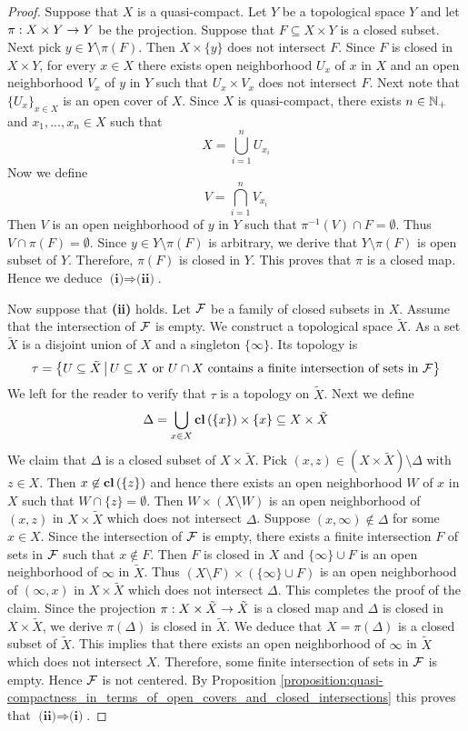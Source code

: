 \begin{proof}
	Suppose that $X$ is a quasi-compact. Let $Y$ be a topological space $Y$ and let $\pi:X\times Y \rightarrow Y$ be the projection. Suppose that $F \subseteq X \times Y$ is a closed subset. Next pick $y \in Y\setminus \pi(F)$. Then $X\times \{y\}$ does not intersect $F$. Since $F$ is closed in $X\times Y$, for every $x \in X$ there exists open neighborhood $U_x$ of $x$ in $X$ and an open neighborhood $V_x$ of $y$ in $Y$ such that $U_x\times V_x$ does not intersect $F$. Next note that $\{U_x\}_{x\in X}$ is an open cover of $X$. Since $X$ is quasi-compact, there exists $n \in {\mathbb N}_+$ and $x_1,...,x_n \in X$ such that
	$$X = \bigcup_{i=1}^nU_{x_i}$$
	Now we define
	$$V = \bigcap_{i=1}^nV_{x_i}$$
	Then $V$ is an open neighborhood of $y$ in $Y$ such that $\pi^{-1}(V) \cap F = \emptyset$. Thus $V \cap \pi(F) = \emptyset$. Since $y \in Y\setminus \pi(F)$ is arbitrary, we derive that $Y\setminus \pi(F)$ is open subset of $Y$. Therefore, $\pi(F)$ is closed in $Y$. This proves that $\pi$ is a closed map. Hence we deduce $\textbf{(i)} \Rightarrow \textbf{(ii)}$.

	Now suppose that \textbf{(ii)} holds. Let ${\mathcal F}$ be a family of closed subsets in $X$. Assume that the intersection of ${\mathcal F}$ is empty. We construct a topological space $\tilde{X}$. As a set $\tilde{X}$ is a disjoint union of $X$ and a singleton $\{\infty\}$. Its topology is
	$$\tau = \big\{U\subseteq \tilde{X}\,\big|\,U\subseteq X\mbox{ or }U\cap X\mbox{ contains a finite intersection of sets in }{\mathcal F}\big\}$$
	We left for the reader to verify that $\tau$ is a topology on $\tilde{X}$. Next we define
	$$\Delta = \bigcup_{x\in X}\mathbf{cl}\left(\{x\}\right)\times \{x\} \subseteq X\times \tilde{X}$$
	We claim that $\Delta$ is a closed subset of $X \times \tilde{X}$. Pick $(x,z) \in \left(X\times \tilde{X}\right)\setminus \Delta$ with $z \in X$. Then $x \not \in \mathbf{cl}\left(\{z\}\right)$ and hence there exists an open neighborhood $W$ of $x$ in $X$ such that $W\cap \{z\} = \emptyset$. Then $W\times \left(X\setminus W\right)$ is an open neighborhood of $(x,z)$ in $X\times \tilde{X}$ which does not intersect $\Delta$. Suppose $(x,\infty) \not \in \Delta$ for some $x \in X$. Since the intersection of ${\mathcal F}$ is empty, there exists a finite intersection $F$ of sets in ${\mathcal F}$ such that $x \not \in F$. Then $F$ is closed in $X$ and $\{\infty\}\cup F$ is an open neighborhood of $\infty$ in $\tilde{X}$. Thus $\left(X\setminus F\right) \times \left(\{\infty\}\cup F\right)$ is an open neighborhood of $(\infty, x)$ in $X\times \tilde{X}$ which does not intersect $\Delta$. This completes the proof of the claim. Since the projection $\pi:X\times \tilde{X} \rightarrow \tilde{X}$ is a closed map and $\Delta$ is closed in $X\times \tilde{X}$, we derive $\pi(\Delta)$ is closed in $\tilde{X}$. We deduce that $X = \pi(\Delta)$ is a closed subset of $\tilde{X}$. This implies that there exists an open neighborhood of $\infty$ in $\tilde{X}$ which does not intersect $X$. Therefore, some finite intersection of sets in ${\mathcal F}$ is empty. Hence ${\mathcal F}$ is not centered. By Proposition \ref{proposition:quasi-compactness_in_terms_of_open_covers_and_closed_intersections} this proves that $\textbf{(ii)}\Rightarrow \textbf{(i)}$.
\end{proof}

